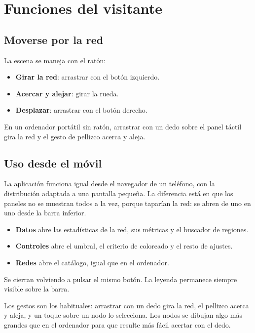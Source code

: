 \section{Funciones del visitante}

\subsection{Moverse por la red}

La escena se maneja con el ratón:

\begin{itemize}
	\item \textbf{Girar la red}: arrastrar con el botón izquierdo.
	\item \textbf{Acercar y alejar}: girar la rueda.
	\item \textbf{Desplazar}: arrastrar con el botón derecho.
\end{itemize}

En un ordenador portátil sin ratón, arrastrar con un dedo sobre el panel táctil gira la red y el
gesto de pellizco acerca y aleja.

\subsection{Uso desde el móvil}

La aplicación funciona igual desde el navegador de un teléfono, con la distribución adaptada a una
pantalla pequeña. La diferencia está en que los paneles no se muestran todos a la vez, porque
taparían la red: se abren de uno en uno desde la barra inferior.

\begin{itemize}
	\item \textbf{Datos} abre las estadísticas de la red, sus métricas y el buscador de regiones.
	\item \textbf{Controles} abre el umbral, el criterio de coloreado y el resto de ajustes.
	\item \textbf{Redes} abre el catálogo, igual que en el ordenador.
\end{itemize}

Se cierran volviendo a pulsar el mismo botón. La leyenda permanece siempre visible sobre la barra.

Los gestos son los habituales: arrastrar con un dedo gira la red, el pellizco acerca y aleja, y un
toque sobre un nodo lo selecciona. Los nodos se dibujan algo más grandes que en el ordenador para
que resulte más fácil acertar con el dedo.

